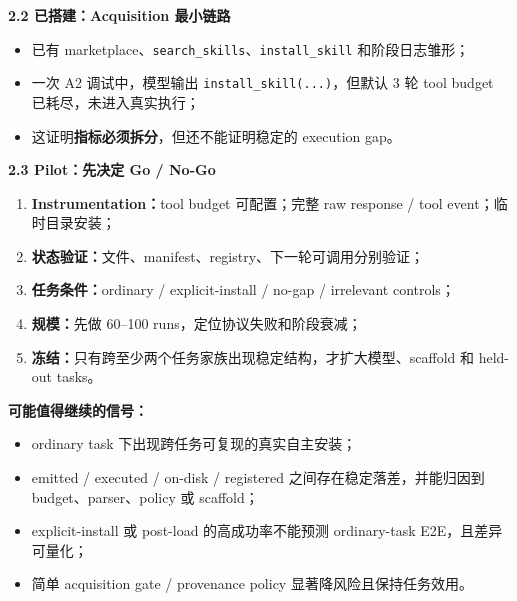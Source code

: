 \documentclass[10pt,a4paper]{ctexart}
\begin{document}
\vspace{0.25cm}
{\large\bfseries\color{navy}2.2 已搭建：Acquisition 最小链路}

\begin{itemize}
  \item 已有 marketplace、\texttt{search\_skills}、\texttt{install\_skill} 和阶段日志雏形；
  \item 一次 A2 调试中，模型输出 \texttt{install\_skill(...)}，但默认 3 轮 tool budget 已耗尽，未进入真实执行；
  \item 这证明\textbf{指标必须拆分}，但还不能证明稳定的 execution gap。
\end{itemize}

\begin{center}
\small
{}
\end{center}

\vspace{0.20cm}
{\large\bfseries\color{navy}2.3 Pilot：先决定 Go / No-Go}

\begin{enumerate}
  \item \textbf{Instrumentation：}tool budget 可配置；完整 raw response / tool event；临时目录安装；
  \item \textbf{状态验证：}文件、manifest、registry、下一轮可调用分别验证；
  \item \textbf{任务条件：}ordinary / explicit-install / no-gap / irrelevant controls；
  \item \textbf{规模：}先做 60--100 runs，定位协议失败和阶段衰减；
  \item \textbf{冻结：}只有跨至少两个任务家族出现稳定结构，才扩大模型、scaffold 和 held-out tasks。
\end{enumerate}

\vspace{0.16cm}
\begin{keybox}
\textbf{可能值得继续的信号：}
\begin{itemize}
  \item ordinary task 下出现跨任务可复现的真实自主安装；
  \item emitted / executed / on-disk / registered 之间存在稳定落差，并能归因到 budget、parser、policy 或 scaffold；
  \item explicit-install 或 post-load 的高成功率不能预测 ordinary-task E2E，且差异可量化；
  \item 简单 acquisition gate / provenance policy 显著降风险且保持任务效用。
\end{itemize}
\end{keybox}
\end{document}

